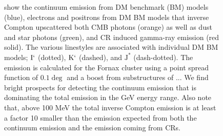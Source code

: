 \documentclass[10pt,aps,pra,reprint,amsmath,amsfonts,amssymb,showpacs]{revtex4-1}
\newcommand{\rmn}{\mathrm}
\newcommand{\Km}{\rmn{K}`}
\newcommand{\Imm}{\rmn{I}`}
\newcommand{\Jm}{\rmn{J}^*}
\begin{document}
\begin{figure}
\begin{minipage}{2.0\columnwidth}
{  show the continuum emission from DM benchmark (BM) models
  (blue), electrons and positrons from DM BM models that inverse
  Compton upscattered both CMB photons (orange) as well as dust and
  star photons (green), and CR induced gamma-ray emission (red
  solid). The various linestyles are associated with individual DM BM
  models; $\Imm$ (dotted), $\Km$ (dashed), and $\Jm$
  (dash-dotted). The emission is calculated for the Fornax cluster
  using a point spread function of $0.1\deg$ and a boost from
  substructures of ...  We find bright prospects for detecting the
  continuum emission that is dominating the total emission in the GeV
  energy range. Also note that, above 100 MeV the total inverse
  Compton emission is at least a factor 10 smaller than the emission
  expected from both the continuum emission and the emission coming
  from CRs.}
 \label{fig7}
\end{minipage}
\end{figure}
\end{document}
